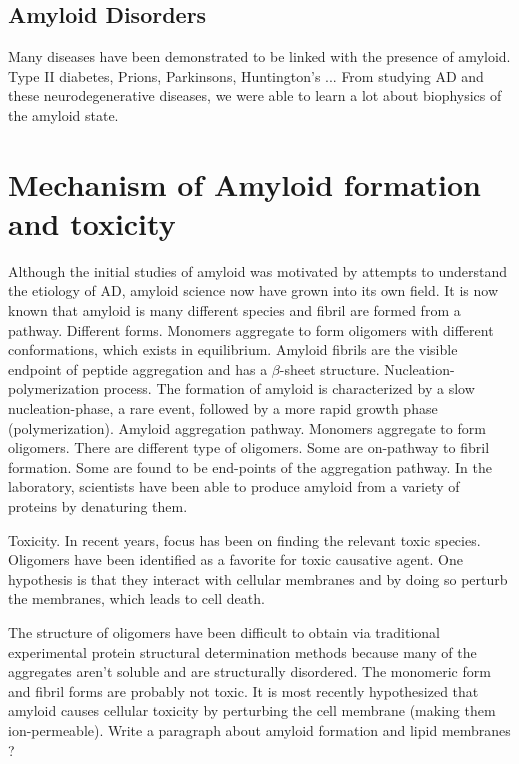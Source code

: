\subsection{Amyloid Disorders}
\1 Many diseases have been demonstrated to be linked with the presence of amyloid. Type II diabetes, Prions, Parkinsons, Huntington's ... 
\1 From studying AD and these neurodegenerative diseases, we were able to learn a lot about biophysics of the amyloid state.


\section{Mechanism of Amyloid formation and toxicity}
\begin{outline}[enumerate]
\1 Although the initial studies of amyloid was motivated by attempts to understand the etiology of AD, amyloid science now have grown into its own field.
  \2 It is now known that amyloid is many different species and fibril are formed from a pathway. Different forms. Monomers aggregate to form oligomers with different conformations, which exists in equilibrium.  Amyloid fibrils are the visible endpoint of peptide aggregation and has a $\beta$-sheet structure.
  \2 Nucleation-polymerization process. The formation of amyloid is characterized by a slow nucleation-phase, a rare event, followed by a more rapid growth phase (polymerization). Amyloid aggregation pathway. Monomers aggregate to form oligomers. There are different type of oligomers. Some are on-pathway to fibril formation. Some are found to be end-points of the aggregation pathway.
  \2 In the laboratory, scientists have been able to produce amyloid from a variety of proteins by denaturing them.

\1 Toxicity. In recent years, focus has been on finding the relevant toxic species. Oligomers have been identified as a favorite for toxic causative agent.  One hypothesis is that they interact with cellular membranes and by doing so perturb the membranes, which leads to cell death.

\1 The structure of oligomers have been difficult to obtain via traditional experimental protein structural determination methods because many of the aggregates aren't soluble and are structurally disordered.   
  \2 The monomeric form and fibril forms are probably not toxic. It is most recently hypothesized that amyloid causes cellular toxicity by perturbing the cell membrane (making them ion-permeable).
  \2 Write a paragraph about amyloid formation and lipid membranes ?
\end{outline}


